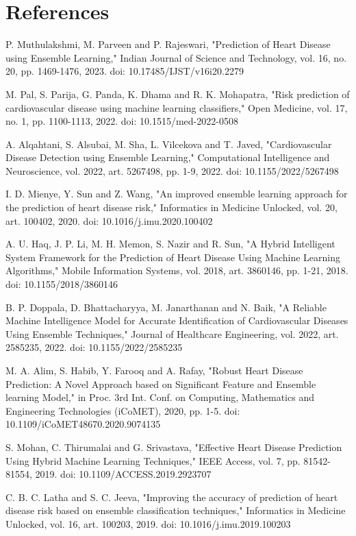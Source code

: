 \documentclass[12pt,a4paper,oneside]{report}
\begin{document}
\chapter{References}
\begin{enumerate}[label={[\arabic*]},leftmargin=2.2em]
  \item P. Muthulakshmi, M. Parveen and P. Rajeswari, "Prediction of Heart Disease using Ensemble Learning," Indian Journal of Science and Technology, vol. 16, no. 20, pp. 1469-1476, 2023. doi: 10.17485/IJST/v16i20.2279
  \item M. Pal, S. Parija, G. Panda, K. Dhama and R. K. Mohapatra, "Risk prediction of cardiovascular disease using machine learning classifiers," Open Medicine, vol. 17, no. 1, pp. 1100-1113, 2022. doi: 10.1515/med-2022-0508
  \item A. Alqahtani, S. Alsubai, M. Sha, L. Vilcekova and T. Javed, "Cardiovascular Disease Detection using Ensemble Learning," Computational Intelligence and Neuroscience, vol. 2022, art. 5267498, pp. 1-9, 2022. doi: 10.1155/2022/5267498
  \item I. D. Mienye, Y. Sun and Z. Wang, "An improved ensemble learning approach for the prediction of heart disease risk," Informatics in Medicine Unlocked, vol. 20, art. 100402, 2020. doi: 10.1016/j.imu.2020.100402
  \item A. U. Haq, J. P. Li, M. H. Memon, S. Nazir and R. Sun, "A Hybrid Intelligent System Framework for the Prediction of Heart Disease Using Machine Learning Algorithms," Mobile Information Systems, vol. 2018, art. 3860146, pp. 1-21, 2018. doi: 10.1155/2018/3860146
  \item B. P. Doppala, D. Bhattacharyya, M. Janarthanan and N. Baik, "A Reliable Machine Intelligence Model for Accurate Identification of Cardiovascular Diseases Using Ensemble Techniques," Journal of Healthcare Engineering, vol. 2022, art. 2585235, 2022. doi: 10.1155/2022/2585235
  \item M. A. Alim, S. Habib, Y. Farooq and A. Rafay, "Robust Heart Disease Prediction: A Novel Approach based on Significant Feature and Ensemble learning Model," in Proc. 3rd Int. Conf. on Computing, Mathematics and Engineering Technologies (iCoMET), 2020, pp. 1-5. doi: 10.1109/iCoMET48670.2020.9074135
  \item S. Mohan, C. Thirumalai and G. Srivastava, "Effective Heart Disease Prediction Using Hybrid Machine Learning Techniques," IEEE Access, vol. 7, pp. 81542-81554, 2019. doi: 10.1109/ACCESS.2019.2923707
  \item C. B. C. Latha and S. C. Jeeva, "Improving the accuracy of prediction of heart disease risk based on ensemble classification techniques," Informatics in Medicine Unlocked, vol. 16, art. 100203, 2019. doi: 10.1016/j.imu.2019.100203

\end{enumerate}
\end{document}
